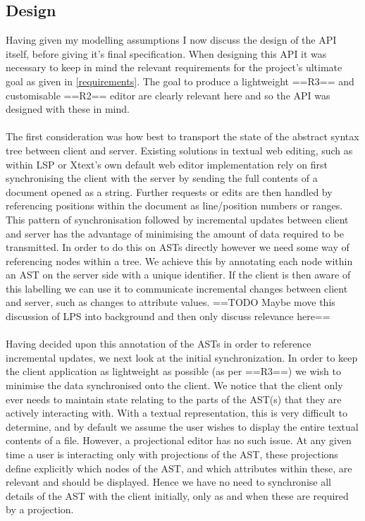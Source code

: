 \documentclass{article}
\begin{document}
\subsection{Design}\label{api}
Having given my modelling assumptions I now discuss the design of the API itself, before giving it's final specification. When designing this API it was necessary to keep in mind the relevant requirements for the project's ultimate goal as given in \ref{requirements}. The goal to produce a lightweight ==R3== and customisable ==R2== editor are clearly relevant here and so the API was designed with these in mind.
\\
\\
The first consideration was how best to transport the state of the abstract syntax tree between client and server. Existing solutions in textual web editing, such as within LSP or Xtext's own default web editor implementation rely on first synchronising the client with the server by sending the full contents of a document opened as a string. Further requests or edits are then handled by referencing positions within the document as line/position numbers or ranges. This pattern of synchronisation followed by incremental updates between client and server has the advantage of minimising the amount of data required to be transmitted. In order to do this on ASTs directly however we need some way of referencing nodes within a tree. We achieve this by annotating each node within an AST on the server side with a unique identifier. If the client is then aware of this labelling we can use it to communicate incremental changes between client and server, such as changes to attribute values.
==TODO Maybe move this discussion of LPS into background and then only discuss relevance here==
\\
\\
Having decided upon this annotation of the ASTs in order to reference incremental updates, we next look at the initial synchronization. In order to keep the client application as lightweight as possible (as per ==R3==) we wish to minimise the data synchronised onto the client. We notice that the client only ever needs to maintain state relating to the parts of the AST(s) that they are actively interacting with. With a textual representation, this is very difficult to determine, and by default we assume the user wishes to display the entire textual contents of a file. However, a projectional editor has no such issue. At any given time a user is interacting only with projections of the AST, these projections define explicitly which nodes of the AST, and which attributes within these, are relevant and should be displayed. Hence we have no need to synchronise all details of the AST with the client initially, only as and when these are required by a projection.
\end{document}

